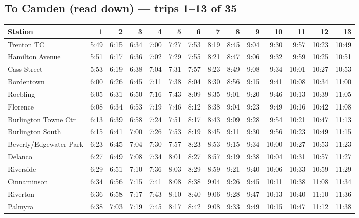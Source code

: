 \subsection*{To Camden (read down) --- trips 1--13 of 35}
\begin{center}\footnotesize\setlength{\tabcolsep}{3pt}\begin{tabular}{@{}lrrrrrrrrrrrrr@{}}\toprule
Station & 1 & 2 & 3 & 4 & 5 & 6 & 7 & 8 & 9 & 10 & 11 & 12 & 13 \\\midrule
Trenton TC & 5:49 & 6:15 & 6:34 & 7:00 & 7:27 & 7:53 & 8:19 & 8:45 & 9:04 & 9:30 & 9:57 & 10:23 & 10:49 \\
Hamilton Avenue & 5:51 & 6:17 & 6:36 & 7:02 & 7:29 & 7:55 & 8:21 & 8:47 & 9:06 & 9:32 & 9:59 & 10:25 & 10:51 \\
Cass Street & 5:53 & 6:19 & 6:38 & 7:04 & 7:31 & 7:57 & 8:23 & 8:49 & 9:08 & 9:34 & 10:01 & 10:27 & 10:53 \\
Bordentown & 6:00 & 6:26 & 6:45 & 7:11 & 7:38 & 8:04 & 8:30 & 8:56 & 9:15 & 9:41 & 10:08 & 10:34 & 11:00 \\
Roebling & 6:05 & 6:31 & 6:50 & 7:16 & 7:43 & 8:09 & 8:35 & 9:01 & 9:20 & 9:46 & 10:13 & 10:39 & 11:05 \\
Florence & 6:08 & 6:34 & 6:53 & 7:19 & 7:46 & 8:12 & 8:38 & 9:04 & 9:23 & 9:49 & 10:16 & 10:42 & 11:08 \\
Burlington Towne Ctr & 6:13 & 6:39 & 6:58 & 7:24 & 7:51 & 8:17 & 8:43 & 9:09 & 9:28 & 9:54 & 10:21 & 10:47 & 11:13 \\
Burlington South & 6:15 & 6:41 & 7:00 & 7:26 & 7:53 & 8:19 & 8:45 & 9:11 & 9:30 & 9:56 & 10:23 & 10:49 & 11:15 \\
Beverly/Edgewater Park & 6:23 & 6:45 & 7:04 & 7:30 & 7:57 & 8:23 & 8:53 & 9:15 & 9:34 & 10:00 & 10:27 & 10:53 & 11:23 \\
Delanco & 6:27 & 6:49 & 7:08 & 7:34 & 8:01 & 8:27 & 8:57 & 9:19 & 9:38 & 10:04 & 10:31 & 10:57 & 11:27 \\
Riverside & 6:29 & 6:51 & 7:10 & 7:36 & 8:03 & 8:29 & 8:59 & 9:21 & 9:40 & 10:06 & 10:33 & 10:59 & 11:29 \\
Cinnaminson & 6:34 & 6:56 & 7:15 & 7:41 & 8:08 & 8:38 & 9:04 & 9:26 & 9:45 & 10:11 & 10:38 & 11:08 & 11:34 \\
Riverton & 6:36 & 6:58 & 7:17 & 7:43 & 8:10 & 8:40 & 9:06 & 9:28 & 9:47 & 10:13 & 10:40 & 11:10 & 11:36 \\
Palmyra & 6:38 & 7:03 & 7:19 & 7:45 & 8:17 & 8:42 & 9:08 & 9:33 & 9:49 & 10:15 & 10:47 & 11:12 & 11:38 \\

\end{tabular}
\end{center}
